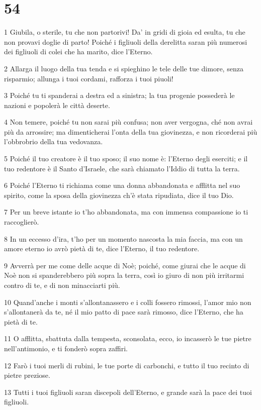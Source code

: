\chapter{54}

\par 1 Giubila, o sterile, tu che non partorivi! Da' in gridi di gioia ed esulta, tu che non provavi doglie di parto! Poiché i figliuoli della derelitta saran più numerosi dei figliuoli di colei che ha marito, dice l'Eterno.
\par 2 Allarga il luogo della tua tenda e si spieghino le tele delle tue dimore, senza risparmio; allunga i tuoi cordami, rafforza i tuoi piuoli!
\par 3 Poiché tu ti spanderai a destra ed a sinistra; la tua progenie possederà le nazioni e popolerà le città deserte.
\par 4 Non temere, poiché tu non sarai più confusa; non aver vergogna, ché non avrai più da arrossire; ma dimenticherai l'onta della tua giovinezza, e non ricorderai più l'obbrobrio della tua vedovanza.
\par 5 Poiché il tuo creatore è il tuo sposo; il suo nome è: l'Eterno degli eserciti; e il tuo redentore è il Santo d'Israele, che sarà chiamato l'Iddio di tutta la terra.
\par 6 Poiché l'Eterno ti richiama come una donna abbandonata e afflitta nel suo spirito, come la sposa della giovinezza ch'è stata ripudiata, dice il tuo Dio.
\par 7 Per un breve istante io t'ho abbandonata, ma con immensa compassione io ti raccoglierò.
\par 8 In un eccesso d'ira, t'ho per un momento nascosta la mia faccia, ma con un amore eterno io avrò pietà di te, dice l'Eterno, il tuo redentore.
\par 9 Avverrà per me come delle acque di Noè; poiché, come giurai che le acque di Noè non si spanderebbero più sopra la terra, così io giuro di non più irritarmi contro di te, e di non minacciarti più.
\par 10 Quand'anche i monti s'allontanassero e i colli fossero rimossi, l'amor mio non s'allontanerà da te, né il mio patto di pace sarà rimosso, dice l'Eterno, che ha pietà di te.
\par 11 O afflitta, sbattuta dalla tempesta, sconsolata, ecco, io incasserò le tue pietre nell'antimonio, e ti fonderò sopra zaffiri.
\par 12 Farò i tuoi merli di rubini, le tue porte di carbonchi, e tutto il tuo recinto di pietre preziose.
\par 13 Tutti i tuoi figliuoli saran discepoli dell'Eterno, e grande sarà la pace dei tuoi figliuoli.
